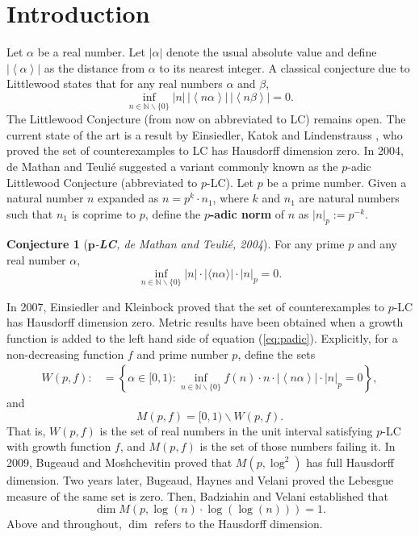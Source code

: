 \documentclass{article}
\theoremstyle{definition}
\newtheorem{conjecture}[theorem]{Conjecture}
\newcommand{\N}{\mathbb{N}}
\numberwithin{equation}{subsection}
\begin{document}
\section{Introduction}

 \noindent Let $\alpha$ be a real number. Let $\left|\alpha\right|$ denote the usual absolute value and define $\left|\left\langle\alpha\right\rangle\right|$ as the distance from $\alpha$ to its nearest integer. A classical conjecture due to Littlewood states that for any real numbers $\alpha$ and $\beta$, \[\inf_{n\in\N\backslash\{0\}}|n|\,|\!\left<n\alpha\right>\!|\,|\!\left< n\beta\right>\!| =0.\]
 \noindent The Littlewood Conjecture (from now on abbreviated to LC) remains open. The current state of the art is a result by Einsiedler, Katok and Lindenstrauss \cite{EKL}, who proved the set of counterexamples to LC has Hausdorff dimension zero. In 2004, de Mathan and Teulié \cite{padic} suggested a variant commonly known as the $p$-adic Littlewood Conjecture (abbreviated to $p$-LC). Let $p$ be a prime number. Given a natural number $n$ expanded as $n=p^k\cdot n_1$, where $k$ and $n_1$ are natural numbers such that $n_1$ is coprime to $p$, define the \textbf{$p$-adic norm} of $n$ as $|n|_p:=p^{-k}$.  \begin{conjecture}[\textit{$\mathbf{p}$-\textbf{LC}, de Mathan and Teulié, 2004}]
     For any prime $p$ and any real number $\alpha$,\begin{equation}
    \inf_{n\in\N\backslash\{0\}}|n|\cdot|\langle n\alpha\rangle|\cdot |n|_p=0. \label{eq:padic}
\end{equation} 
 \end{conjecture} \noindent In 2007, Einsiedler and Kleinbock  \cite{2007} proved that the set of counterexamples to $p$-LC has Hausdorff dimension zero. Metric results have been obtained when a growth function is added to the left hand side of equation (\ref{eq:padic}). Explicitly, for a non-decreasing function $f$ and prime number $p$, define the sets
  \begin{align}
     W(p,f):&=\left\{\alpha\in[0,1): \inf_{n\in\N\backslash\{0\}}f(n)\cdot n\cdot\left|\left\langle n\alpha\right\rangle\right|\cdot|n|_{p}=0\right\},\label{W(p,f)}
 \end{align}  and \begin{equation}
 M(p,f)=[0,1)\backslash W(p,f).\label{M(p,f)}\end{equation} That is, $W(p,f)$ is the set of real numbers in the unit interval satisfying $p$-LC with growth function $f$, and $M(p,f)$ is the set of those numbers failing it. In 2009, Bugeaud and Moshchevitin \cite{log2CE} proved that $M(p,\log^2)$ has full Hausdorff dimension. Two years later, Bugeaud, Haynes and Velani \cite{Metric} proved the Lebesgue measure of the same set is zero. Then,  Badziahin and Velani \cite{mixed} established that $$\dim M(p,\log(n)\cdot\log(\log(n)))=1.$$ Above and throughout, $\dim$ refers to the Hausdorff dimension.\\
\end{document}
